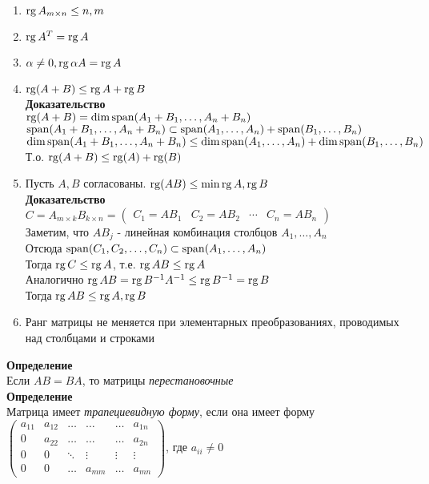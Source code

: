 \documentclass[12pt]{article}
\begin{document}
\begin{enumerate}
    \item $\operatorname{rg} A_{m\times n} \leq n,m$
    \item $\operatorname{rg} A^T = \operatorname{rg} A$
    \item $\alpha \neq 0, \operatorname{rg} \alpha A = \operatorname{rg} A$
    \item $\operatorname{rg} (A+B) \leq \operatorname{rg} A + \operatorname{rg} B$\\
    \textbf{Доказательство}\\
    $\operatorname{rg} (A+B) = \dim\operatorname{span}(A_1+B_1, \ldots, A_n+B_n)$\\
    $\operatorname{span}(A_1+B_1, \ldots, A_n+B_n) \subset \operatorname{span}(A_1, \ldots, A_n) + \operatorname{span}(B_1, \ldots, B_n)$\\
    $\dim\operatorname{span}(A_1+B_1, \ldots, A_n+B_n) \leq \dim\operatorname{span}(A_1, \ldots, A_n) + \dim\operatorname{span}(B_1, \ldots, B_n)$\\
    Т.о. $\operatorname{rg}(A+B) \leq \operatorname{rg}(A) + \operatorname{rg}(B)$
    \item Пусть $A,B$ согласованы. $\operatorname{rg}(AB) \leq \min \operatorname{rg} A, \operatorname{rg} B$\\
    \textbf{Доказательство}\\
    $C = A_{m\times k}B_{k\times n} = \begin{pmatrix}C_1 = AB_1 & C_2 = AB_2 & \cdots & C_n = AB_n \end{pmatrix}$\\
    Заметим, что $AB_j$ - линейная комбинация столбцов $A_1,\ldots, A_n$\\
    Отсюда $\operatorname{span}(C_1, C_2, \ldots, C_n) \subset \operatorname{span}(A_1, \ldots, A_n)$\\
    Тогда $\operatorname{rg} C \leq \operatorname{rg} A$, т.е. $\operatorname{rg} AB \leq \operatorname{rg} A$\\
    Аналогично $\operatorname{rg} AB = \operatorname{rg} B^{-1}A^{-1} \leq \operatorname{rg} B^{-1} = \operatorname{rg} B$\\
    Тогда $\operatorname{rg} AB \leq \operatorname{rg} A, \operatorname{rg} B$
    \item Ранг матрицы не меняется при элементарных преобразованиях, проводимых над столбцами и строками
\end{enumerate}
\textbf{Определение}\\
Если $AB=BA$, то матрицы \textit{перестановочные}\\
\textbf{Определение}\\
Матрица имеет \textit{трапециевидную форму}, если она имеет форму $\begin{pmatrix} 
a_{11} & a_{12} &\ldots& \ldots & \ldots & a_{1n}\\
0 & a_{22} & \ldots & \ldots & \ldots & a_{2n}\\
0 & 0 & \ddots & \vdots & \vdots & \vdots \\
0 & 0 & \ldots & a_{mm} & \ldots & a_{mn}
\end{pmatrix}$, где $a_{ii} \neq 0$\\
\end{document}
